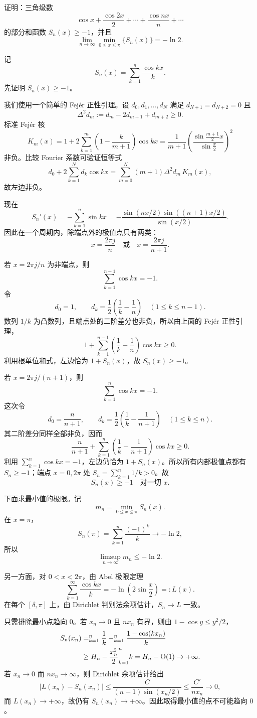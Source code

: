 \begin{xreferenceproblem}[20]
证明：三角级数
  \[
    \cos x+\frac{\cos2x}{2}+\cdots+\frac{\cos nx}{n}+\cdots
  \]
  的部分和函数 $S_n(x)\ge-1$，并且
  \[
    \lim_{n\to\infty}\min_{0\le x\le\pi}\{S_n(x)\}=-\ln2.
  \]
\end{xreferenceproblem}
\begin{xsolution}
记
\[
  S_n(x)=\sum_{k=1}^{n}\frac{\cos kx}{k}.
\]
先证明 $S_n(x)\ge-1$。

我们使用一个简单的 Fejér 正性引理。设
$d_0,d_1,\ldots,d_N$ 满足
$d_{N+1}=d_{N+2}=0$ 且
\[
  \Delta^2d_m:=d_m-2d_{m+1}+d_{m+2}\ge0.
\]
标准 Fejér 核
\[
  K_m(x)=1+2\sum_{k=1}^{m}\left(1-\frac{k}{m+1}\right)\cos kx
  =\frac1{m+1}\left(\frac{\sin\frac{m+1}{2}x}{\sin\frac x2}\right)^2
\]
非负。比较 Fourier 系数可验证恒等式
\[
  d_0+2\sum_{k=1}^{N}d_k\cos kx
  =\sum_{m=0}^{N}(m+1)\Delta^2d_m\,K_m(x),
\]
故左边非负。

现在
\[
  S_n'(x)=-\sum_{k=1}^{n}\sin kx
  =-\frac{\sin(nx/2)\sin((n+1)x/2)}{\sin(x/2)}.
\]
因此在一个周期内，除端点外的极值点只有两类：
\[
  x=\frac{2\pi j}{n}
  \quad\text{或}\quad
  x=\frac{2\pi j}{n+1}.
\]

若 $x=2\pi j/n$ 为非端点，则
\[
  \sum_{k=1}^{n-1}\cos kx=-1.
\]
令
\[
  d_0=1,\qquad
  d_k=\frac12\left(\frac1k-\frac1n\right)\quad(1\le k\le n-1).
\]
数列 $1/k$ 为凸数列，且端点处的二阶差分也非负，所以由上面的 Fejér 正性引理，
\[
  1+\sum_{k=1}^{n-1}\left(\frac1k-\frac1n\right)\cos kx\ge0.
\]
利用根单位和式，左边恰为 $1+S_n(x)$，故 $S_n(x)\ge-1$。

若 $x=2\pi j/(n+1)$，则
\[
  \sum_{k=1}^{n}\cos kx=-1.
\]
这次令
\[
  d_0=\frac{n}{n+1},\qquad
  d_k=\frac12\left(\frac1k-\frac1{n+1}\right)\quad(1\le k\le n).
\]
其二阶差分同样全部非负，因而
\[
  \frac{n}{n+1}+
  \sum_{k=1}^{n}\left(\frac1k-\frac1{n+1}\right)\cos kx\ge0.
\]
利用 $\sum_{k=1}^n\cos kx=-1$，左边仍恰为 $1+S_n(x)$。所以所有内部极值点都有 $S_n\ge-1$；端点 $x=0,2\pi$ 处 $S_n=\sum_{k=1}^n1/k>0$。故
\[
  \boxed{S_n(x)\ge-1\quad\text{对一切 }x}.
\]

下面求最小值的极限。记
\[
  m_n=\min_{0\le x\le\pi}S_n(x).
\]
在 $x=\pi$，
\[
  S_n(\pi)=\sum_{k=1}^{n}\frac{(-1)^k}{k}\longrightarrow-\ln2,
\]
所以
\[
  \limsup_{n\to\infty}m_n\le-\ln2.
\]

另一方面，对 $0<x<2\pi$，由 Abel 极限定理
\[
  \sum_{k=1}^{\infty}\frac{\cos kx}{k}
  =-\ln\left(2\sin\frac x2\right)=:L(x).
\]
在每个 $[\delta,\pi]$ 上，由 Dirichlet 判别法余项估计，$S_n\to L$ 一致。

只需排除最小点趋向 $0$。若 $x_n\to0$ 且 $nx_n$ 有界，则由
$1-\cos y\le y^2/2$，
\begin{align*}
  S_n(x_n)
  &=\relax_{k=1}^{n}\frac1k
    -\relax_{k=1}^{n}\frac{1-\cos(kx_n)}k\\
  &\ge H_n-\frac{x_n^2}{2}\relax_{k=1}^{n}k
  =H_n-\mathrm{O}(1)\to+\infty.
\end{align*}
若 $x_n\to0$ 而 $nx_n\to\infty$，则 Dirichlet 余项估计给出
\[
  \left|L(x_n)-S_n(x_n)\right|
  \le\frac{C}{(n+1)\sin(x_n/2)}
  \le\frac{C'}{nx_n}\to0,
\]
而 $L(x_n)\to+\infty$，故仍有 $S_n(x_n)\to+\infty$。因此取得最小值的点不可能趋向 $0$。


\end{xsolution}
